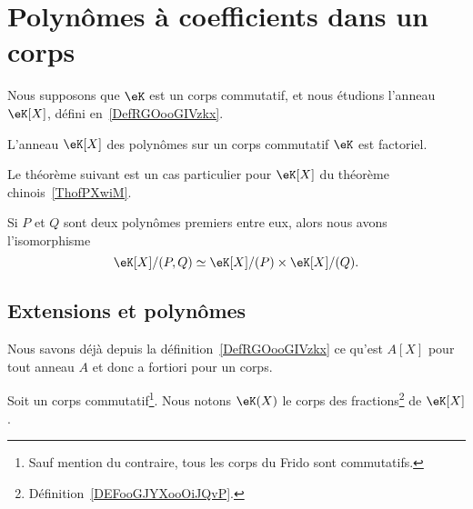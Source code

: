 \section{Polynômes à coefficients dans un corps}
\label{SECooFYOGooQHitgE}

Nous supposons que \( \eK\) est un corps commutatif, et nous étudions l'anneau \( \eK[X]\), défini en~\ref{DefRGOooGIVzkx}.

\begin{proposition}     \label{PropqGZXvr}
    L'anneau \( \eK[X]\) des polynômes sur un corps commutatif \( \eK\) est factoriel.
\end{proposition}

Le théorème suivant est un cas particulier pour \( \eK[X]\) du théorème chinois~\ref{ThofPXwiM}.
\begin{theorem}
    Si \( P\) et \( Q\) sont deux polynômes premiers entre eux, alors nous avons l'isomorphisme
    \begin{equation}
        \eK[X]/(P,Q)\simeq\eK[X]/(P)\times \eK[X]/(Q).
    \end{equation}
\end{theorem}


\subsection{Extensions et polynômes}

Nous savons déjà depuis la définition~\ref{DefRGOooGIVzkx} ce qu'est \( A[X]\) pour tout anneau \( A\) et donc a fortiori pour un corps.

\begin{definition}  \label{DEFooQPZIooQYiNVh}
    Soit un corps commutatif\footnote{Sauf mention du contraire, tous les corps du Frido sont commutatifs.}. Nous notons \( \eK(X)\) le corps des fractions\footnote{Définition~\ref{DEFooGJYXooOiJQvP}.} de \( \eK[X]\).
\end{definition}


